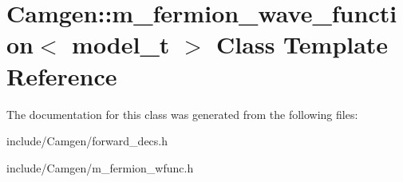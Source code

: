 \hypertarget{a00332}{\section{Camgen\-:\-:m\-\_\-fermion\-\_\-wave\-\_\-function$<$ model\-\_\-t $>$ Class Template Reference}
\label{a00332}
}


The documentation for this class was generated from the following files\-:\begin{DoxyCompactItemize}
\item 
include/\-Camgen/forward\-\_\-decs.\-h\item 
include/\-Camgen/m\-\_\-fermion\-\_\-wfunc.\-h\end{DoxyCompactItemize}
